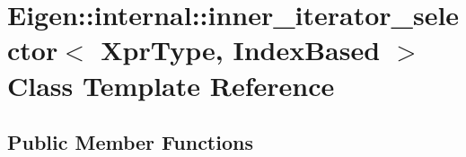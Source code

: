 \hypertarget{class_eigen_1_1internal_1_1inner__iterator__selector_3_01_xpr_type_00_01_index_based_01_4}{}\section{Eigen\+:\+:internal\+:\+:inner\+\_\+iterator\+\_\+selector$<$ Xpr\+Type, Index\+Based $>$ Class Template Reference}
\label{class_eigen_1_1internal_1_1inner__iterator__selector_3_01_xpr_type_00_01_index_based_01_4}
\subsection*{Public Member Functions}
